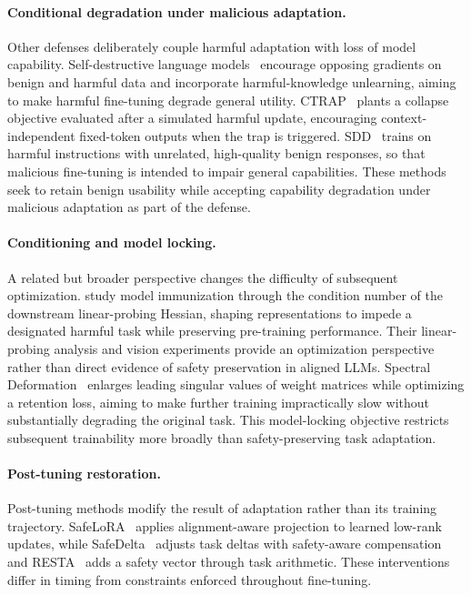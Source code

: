 \documentclass{article}
\begin{document}
\paragraph{Conditional degradation under malicious adaptation.} Other defenses deliberately couple harmful adaptation with loss of model capability. Self-destructive language models~\citep{wang2026self} encourage opposing gradients on benign and harmful data and incorporate harmful-knowledge unlearning, aiming to make harmful fine-tuning degrade general utility. CTRAP~\citep{yi2026ctrap} plants a collapse objective evaluated after a simulated harmful update, encouraging context-independent fixed-token outputs when the trap is triggered. SDD~\citep{chen2025sdd} trains on harmful instructions with unrelated, high-quality benign responses, so that malicious fine-tuning is intended to impair general capabilities. These methods seek to retain benign usability while accepting capability degradation under malicious adaptation as part of the defense.

\paragraph{Conditioning and model locking.} A related but broader perspective changes the difficulty of subsequent optimization. \citet{zheng2025model} study model immunization through the condition number of the downstream linear-probing Hessian, shaping representations to impede a designated harmful task while preserving pre-training performance. Their linear-probing analysis and vision experiments provide an optimization perspective rather than direct evidence of safety preservation in aligned LLMs. Spectral Deformation~\citep{rosati2025locking} enlarges leading singular values of weight matrices while optimizing a retention loss, aiming to make further training impractically slow without substantially degrading the original task. This model-locking objective restricts subsequent trainability more broadly than safety-preserving task adaptation. 

\paragraph{Post-tuning restoration.} Post-tuning methods modify the result of adaptation rather than its training trajectory. SafeLoRA~\citep{safe-lora} applies alignment-aware projection to learned low-rank updates, while SafeDelta~\citep{safe-delta} adjusts task deltas with safety-aware compensation and RESTA~\citep{Resta} adds a safety vector through task arithmetic. These interventions differ in timing from constraints enforced throughout fine-tuning. 
\end{document}
